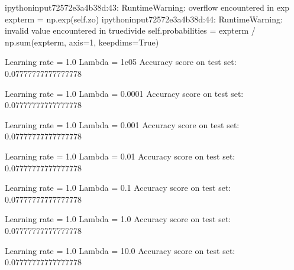 \documentclass[letterpaper,10pt,english]{sphinxmanual}
\begin{document}
\begin{sphinxVerbatim}[commandchars=\\\{\}]
\PYGZlt{}ipython\PYGZhy{}input\PYGZhy{}7\PYGZhy{}2572e3a4b38d\PYGZgt{}:43: RuntimeWarning: overflow encountered in exp
  exp\PYGZus{}term = np.exp(self.z\PYGZus{}o)
\PYGZlt{}ipython\PYGZhy{}input\PYGZhy{}7\PYGZhy{}2572e3a4b38d\PYGZgt{}:44: RuntimeWarning: invalid value encountered in true\PYGZus{}divide
  self.probabilities = exp\PYGZus{}term / np.sum(exp\PYGZus{}term, axis=1, keepdims=True)
\end{sphinxVerbatim}

\begin{sphinxVerbatim}[commandchars=\\\{\}]
Learning rate  =  1.0
Lambda =  1e\PYGZhy{}05
Accuracy score on test set:  0.07777777777777778
\end{sphinxVerbatim}

\begin{sphinxVerbatim}[commandchars=\\\{\}]
Learning rate  =  1.0
Lambda =  0.0001
Accuracy score on test set:  0.07777777777777778
\end{sphinxVerbatim}

\begin{sphinxVerbatim}[commandchars=\\\{\}]
Learning rate  =  1.0
Lambda =  0.001
Accuracy score on test set:  0.07777777777777778
\end{sphinxVerbatim}

\begin{sphinxVerbatim}[commandchars=\\\{\}]
Learning rate  =  1.0
Lambda =  0.01
Accuracy score on test set:  0.07777777777777778
\end{sphinxVerbatim}

\begin{sphinxVerbatim}[commandchars=\\\{\}]
Learning rate  =  1.0
Lambda =  0.1
Accuracy score on test set:  0.07777777777777778
\end{sphinxVerbatim}

\begin{sphinxVerbatim}[commandchars=\\\{\}]
Learning rate  =  1.0
Lambda =  1.0
Accuracy score on test set:  0.07777777777777778
\end{sphinxVerbatim}

\begin{sphinxVerbatim}[commandchars=\\\{\}]
Learning rate  =  1.0
Lambda =  10.0
Accuracy score on test set:  0.07777777777777778
\end{sphinxVerbatim}
\end{document}
